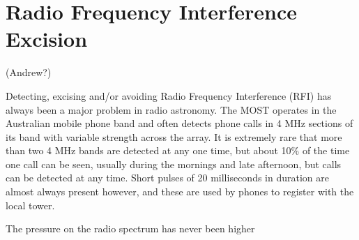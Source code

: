 \section{Radio Frequency Interference Excision} (Andrew?)

Detecting, excising and/or avoiding Radio Frequency Interference (RFI) has always been a major problem in radio astronomy. The MOST operates in the Australian mobile phone band and often detects phone calls in 4 MHz sections of its band with variable strength across the array. It is extremely rare that more than two 4 MHz bands are detected at any one time, but about 10\% of the time one call can be seen, usually during the mornings and late afternoon, but calls can be detected at any time. Short pulses of 20 milliseconds in duration are almost always present however, and these are used by phones to register with the local tower.

The pressure on the radio spectrum has never been higher